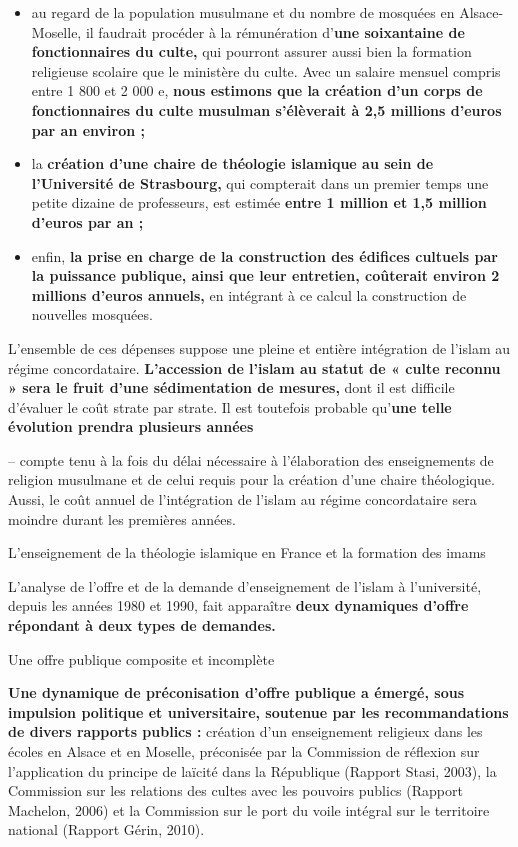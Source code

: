 \begin{itemize}
\item
  au regard de la population musulmane et du nombre de mosquées en
  Alsace- Moselle, il faudrait procéder à la rémunération d'\textbf{une
  soixantaine de fonctionnaires du culte,} qui pourront assurer aussi
  bien la formation religieuse scolaire que le ministère du culte. Avec
  un salaire mensuel compris entre 1 800 et 2 000 e, \textbf{nous
  estimons que la création d'un corps de fonctionnaires du culte
  musulman s'élèverait à 2,5 millions d'euros par an environ ;}
\item
  la \textbf{création d'une chaire de théologie islamique au sein de
  l'Université de Strasbourg,} qui compterait dans un premier temps une
  petite dizaine de professeurs, est estimée \textbf{entre 1 million et
  1,5 million d'euros par an ;}
\item
  enfin, \textbf{la prise en charge de la construction des édifices
  cultuels par la puissance publique, ainsi que leur entretien,
  coûterait environ 2 millions d'euros annuels,} en intégrant à ce
  calcul la construction de nouvelles mosquées.
\end{itemize}


L'ensemble de ces dépenses suppose une pleine et entière intégration de
l'islam au régime concordataire. \textbf{L'accession de l'islam au
statut de « culte reconnu » sera le fruit d'une sédimentation de
mesures,} dont il est difficile d'évaluer le coût strate par strate. Il
est toutefois probable qu'\textbf{une telle évolution prendra plusieurs
années}

-- compte tenu à la fois du délai nécessaire à l'élaboration des
enseignements de religion musulmane et de celui requis pour la création
d'une chaire théologique. Aussi, le coût annuel de l'intégration de
l'islam au régime concordataire sera moindre durant les premières
années.




L'enseignement de la théologie islamique en France et la formation des
imams


L'analyse de l'offre et de la demande d'enseignement de l'islam à
l'université, depuis les années 1980 et 1990, fait apparaître
\textbf{deux dynamiques d'offre répondant à deux types de demandes.}


Une offre publique composite et incomplète


\textbf{Une dynamique de préconisation d'offre publique a émergé, sous
impulsion politique et universitaire, soutenue par les recommandations
de divers rapports publics :} création d'un enseignement religieux dans
les écoles en Alsace et en Moselle, préconisée par la Commission de
réflexion sur l'application du principe de laïcité dans la République
(Rapport Stasi, 2003), la Commission sur les relations des cultes avec
les pouvoirs publics (Rapport Machelon, 2006) et la Commission sur le
port du voile intégral sur le territoire national (Rapport Gérin, 2010).

